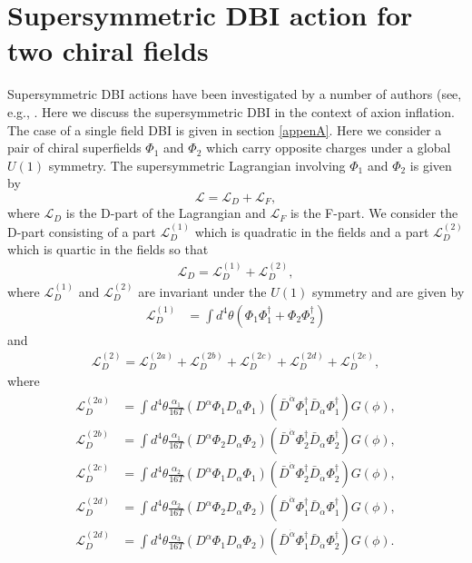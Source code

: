 \documentclass[a4paper,11pt]{article}
\def\non{\nonumber\\}
\def\non{\nonumber\\}
\begin{document}
\section{Supersymmetric DBI action for two chiral fields \label{sec3}}
  Supersymmetric DBI actions have been investigated by a number of authors
  (see, e.g., \cite{Khoury:2010gb,Khoury:2011da,Baumann:2011nk,Baumann:2011nm,Rocek:1997hi,Tseytlin:1999dj,Ito:2007hy,Billo:2008sp,Sasaki:2012ka,Aoki:2016tod}.
  Here we discuss the supersymmetric DBI in the context of axion inflation.
  The case of a single field DBI is given in section \ref{appenA}.
  Here we consider a pair of chiral superfields $\Phi_1$ and $\Phi_2$ which carry opposite
  charges under a global $U(1)$ symmetry.
  The supersymmetric Lagrangian involving $\Phi_1$ and $\Phi_2$ is given by
  \begin{equation}
    \mathcal{L}= \mathcal{L}_D+\mathcal{L}_{F},
    \label{1.1}
  \end{equation}
  where $\mathcal{L}_D$ is the D-part of the Lagrangian and $\mathcal{L}_{F}$ is the F-part. We consider the D-part consisting of
  a part $\mathcal{L}^{(1)}_D$ which is quadratic in the fields and a part $\mathcal{L}^{(2)}_D$ which is quartic in the fields so that
  \begin{align}
    \mathcal{L}_D = \mathcal{L}^{(1)}_D + \mathcal{L}^{(2)}_D,
    \label{Lag.9}
  \end{align}
  where $\mathcal{L}^{(1)}_D$ and $\mathcal{L}^{(2)}_D$ are invariant under the $U(1)$ symmetry and are given by
  \begin{align}
    \mathcal{L}^{(1)}_D
    &= \int d^4\theta \left(\Phi_1 \Phi_1^\dagger + \Phi_2 \Phi_2^\dagger \right)
    \label{Lag.10}
  \end{align}
  and
  \begin{align}
    \mathcal{L}^{(2)}_D=
    \mathcal{L}^{(2a)}_D+
    \mathcal{L}^{(2b)}_D+
    \mathcal{L}^{(2c)}_D+
    \mathcal{L}^{(2d)}_D+
    \mathcal{L}^{(2e)}_D,
  \end{align}
  where 
  \begin{align}
    \mathcal{L}^{(2a)}_D&=
      \int d^4\theta
      \frac{\alpha_1}{16T}\left(D^\alpha \Phi_1 D_\alpha \Phi_1\right)\left({\bar{D}}^{\dot{\alpha}}\Phi_1^\dagger {\bar{D}}_{\dot{\alpha}}\Phi_1^\dagger \right)
      G(\phi),\non
    \mathcal{L}^{(2b)}_D &=
      \int d^4\theta
      \frac{\alpha_1}{16T}\left(D^\alpha \Phi_2 D_\alpha \Phi_2\right)\left({\bar{D}}^{\dot{\alpha}}\Phi_2^\dagger {\bar{D}}_{\dot{\alpha}}\Phi_2^\dagger \right)
      G(\phi),\non
    \mathcal{L}^{(2c)}_D &=
      \int d^4\theta
      \frac{\alpha_2}{16T}\left(D^\alpha \Phi_1 D_\alpha \Phi_1\right)\left({\bar{D}}^{\dot{\alpha}}\Phi_2^\dagger {\bar{D}}_{\dot{\alpha}}\Phi_2^\dagger \right)
      G(\phi),\non
    \mathcal{L}^{(2d)}_D &=
      \int d^4\theta
      \frac{\alpha_2}{16T}\left(D^\alpha \Phi_2 D_\alpha \Phi_2\right)\left({\bar{D}}^{\dot{\alpha}}\Phi_1^\dagger {\bar{D}}_{\dot{\alpha}}\Phi_1^\dagger \right)
      G(\phi),\non
    \mathcal{L}^{(2d)}_D &=
      \int d^4\theta
      \frac{\alpha_3}{16T}\left(D^\alpha \Phi_1 D_\alpha \Phi_2\right)\left({\bar{D}}^{\dot{\alpha}}\Phi_1^\dagger {\bar{D}}_{\dot{\alpha}}\Phi_2^\dagger \right)
      G(\phi).
    \label{Lag.11}
  \end{align}
\end{document}
